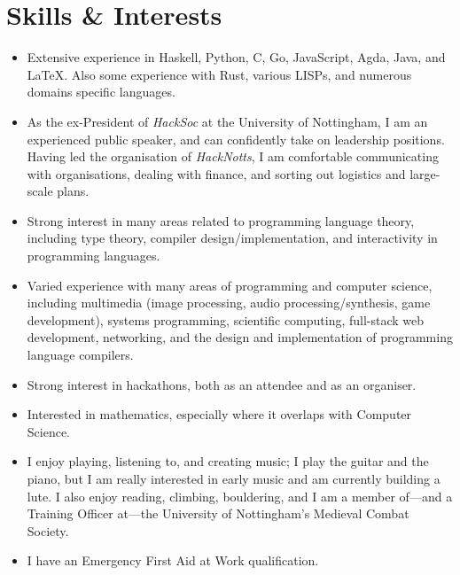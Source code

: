 \documentclass[12pt]{article}
\begin{document}
\section*{Skills \& Interests}
\begin{itemize}
	\item Extensive experience in Haskell, Python, C, Go, JavaScript, Agda, Java, and \LaTeX. Also some experience with Rust, various LISPs, and numerous domains specific languages.
	\item As the ex-President of \textit{HackSoc} at the University of Nottingham, I am an experienced public speaker, and can confidently take on leadership positions. Having led the organisation of \textit{HackNotts}, I am comfortable communicating with organisations, dealing with finance, and sorting out logistics and large-scale plans.
	\item Strong interest in many areas related to programming language theory, including type theory, compiler design/implementation, and interactivity in programming languages.
	\item Varied experience with many areas of programming and computer science, including multimedia (image processing, audio processing/synthesis, game development), systems programming, scientific computing, full-stack web development, networking, and the design and implementation of programming language compilers.
	\item Strong interest in hackathons, both as an attendee and as an organiser.
	\item Interested in mathematics, especially where it overlaps with Computer Science.
	\item I enjoy playing, listening to, and creating music; I play the guitar and the piano, but I am really interested in early music and am currently building a lute. I also enjoy reading, climbing, bouldering, and I am a member of---and a Training Officer at---the University of Nottingham's Medieval Combat Society.
	\item I have an Emergency First Aid at Work qualification.
\end{itemize}
\end{document}
